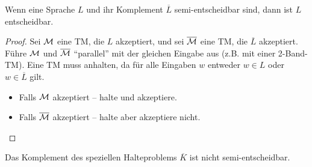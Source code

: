 


\begin{Satz}[name={[{$L,\overline{L}$ semi-entscheidbar $\=> L$ entscheidbar}]},restate={[name=Wiederholung]repeatSatz613}]\label{satz:6.13}
	Wenn eine Sprache $L$ und ihr Komplement $\overline{L}$ semi-entscheidbar sind, dann ist $L$ entscheidbar.
\end{Satz}


\begin{proof}
	Sei $\mathcal{M}$ eine \ac{TM}, die $L$ akzeptiert, und sei $\overline{\mathcal{M}}$ eine \ac{TM}, die $\overline{L}$ akzeptiert.
	Führe $\mathcal{M}$ und $\overline{\mathcal{M}}$ "`parallel"' mit der gleichen Eingabe aus (z.B. mit einer 2-Band-\ac{TM}).\newline
	Eine \ac{TM} muss anhalten, da für alle Eingaben $w$ entweder $w \in L$ oder $w \in \overline{L}$ gilt.
	\begin{itemize}
		\item Falls $\mathcal{M}$ akzeptiert -- halte und akzeptiere.
		\item Falls $\overline{\mathcal{M}}$ akzeptiert -- halte aber akzeptiere nicht. \qedhere
	\end{itemize}
\end{proof}


\begin{Korollar}[name={[Komplement des speziellen Halteproblems ist semi-entscheidbar]}]\label{kor:6.11}
	Das Komplement des speziellen Halteproblems $\overline{K}$
	ist nicht semi-{\linebreak}entscheidbar.
\end{Korollar}


